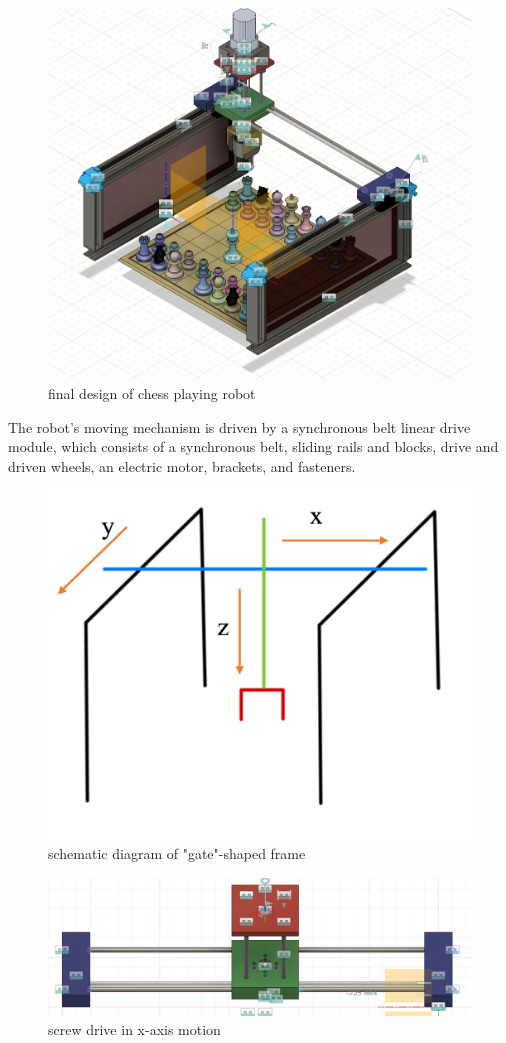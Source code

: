 \documentclass[10pt, a4paper, twocolumn]{article}
\begin{document}
\begin{figure}
    \centering
    \includegraphics[width=0.8\linewidth]{final design.png}
    \caption{final design of chess playing robot}
    \label{fig:final design}
\end{figure}

The robot's moving mechanism is driven by a synchronous belt linear drive module, which consists of a synchronous belt, sliding rails and blocks, drive and driven wheels, an electric motor, brackets, and fasteners.

\begin{figure}
    \centering
    \includegraphics[width=0.5\linewidth]{schematic diagram.png}
    \caption{schematic diagram of "gate"-shaped frame}
    \label{fig:schematic diagram}
\end{figure}

\begin{figure}
    \centering
    \includegraphics[width=0.8\linewidth]{screw drive in x-axis motion.png}
    \caption{screw drive in x-axis motion}
    \label{fig:screw drive in x-axis motion}
\end{figure}
\end{document}
